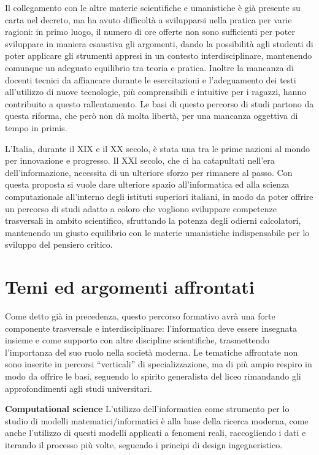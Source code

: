 Il collegamento con le altre materie scientifiche e umanistiche è già presente su carta nel decreto, ma ha avuto difficoltà a svilupparsi nella pratica per varie ragioni: in primo luogo, il numero di ore offerte non sono sufficienti per poter sviluppare in maniera esaustiva gli argomenti, dando la possibilità agli studenti di poter applicare gli strumenti appresi in un contesto interdisciplinare, mantenendo comunque un adeguato equilibrio tra teoria e pratica. Inoltre la mancanza di docenti tecnici da affiancare durante le esercitazioni \cite{problemi_riforma} e l’adeguamento dei testi all’utilizzo di nuove tecnologie, più comprensibili e intuitive per i ragazzi, hanno contribuito a questo rallentamento. 
Le basi di questo percorso di studi partono da questa riforma, che però non dà molta libertà, per una mancanza oggettiva di tempo in primis.

L’Italia, durante il XIX e il XX secolo, è stata una tra le prime nazioni al mondo per innovazione e progresso. Il XXI secolo, che ci ha catapultati nell’era dell’informazione, necessita di un ulteriore sforzo per rimanere al passo. Con questa proposta si vuole dare ulteriore spazio all’informatica ed alla scienza computazionale all’interno degli istituti superiori italiani, in modo da poter offrire un percorso di studi adatto a coloro che vogliono sviluppare competenze trasversali in ambito scientifico, sfruttando la potenza degli odierni calcolatori, mantenendo un giusto equilibrio con le materie umanistiche indispensabile per lo sviluppo del pensiero critico.

\section{Temi ed argomenti affrontati}

Come detto già in precedenza, questo percorso formativo avrà una forte componente trasversale e interdisciplinare: l’informatica deve essere insegnata insieme e come supporto con altre discipline scientifiche, trasmettendo l’importanza del suo ruolo nella società moderna.
Le tematiche affrontate non sono inserite in percorsi “verticali” di specializzazione, ma di più ampio respiro in modo da offrire le basi, seguendo lo spirito generalista del liceo rimandando gli approfondimenti agli studi universitari.

\textbf{Computational science} L’utilizzo dell’informatica come strumento per lo studio di modelli matematici/informatici è alla base della ricerca moderna, come anche l’utilizzo di questi modelli applicati a fenomeni reali, raccogliendo i dati e iterando il processo più volte, seguendo i principi di design ingegneristico.

